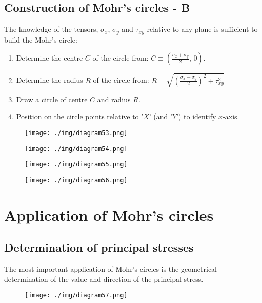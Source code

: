 \subsection{Construction of Mohr's circles - B}
The knowledge of the tensors, $\sigma_x$, $\sigma_y$ and $\tau_{xy}$ relative to any plane is sufficient to build the Mohr's circle:
\begin{enumerate}
  \item Determine the centre $C$ of the circle from: $C \equiv \left(\frac{\sigma_x + \sigma_y}{2}, \, 0\right)$.
  \item Determine the radius $R$ of the circle from: $R = \sqrt{\left(\frac{\sigma_x - \sigma_y}{2}\right)^2 + \tau^2_{xy}}$
  \item Draw a circle of centre $C$ and radius $R$.
  \item Position on the circle points relative to '$X$' (and '$Y$') to identify $x$-axis.
\end{enumerate}
\begin{figure}[H]
  \begin{minipage}{0.25\textwidth}
    \centering
    \texttt{[image: ./img/diagram53.png]}
  \end{minipage}
  \begin{minipage}{0.25\textwidth}
    \centering
    \texttt{[image: ./img/diagram54.png]}
  \end{minipage}
  \begin{minipage}{0.25\textwidth}
    \centering
    \texttt{[image: ./img/diagram55.png]}
  \end{minipage}
  \begin{minipage}{0.25\textwidth}
    \centering
    \texttt{[image: ./img/diagram56.png]}
  \end{minipage}
  \caption{}
\end{figure}
\section{Application of Mohr's circles}
\subsection{Determination of principal stresses}
The most important application of Mohr's circles is the geometrical determination of the value and direction of the principal stress.
\begin{figure}[H]
  \centering
  \texttt{[image: ./img/diagram57.png]}
  \caption{}
\end{figure}
